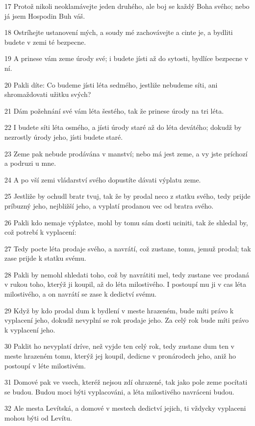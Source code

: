 \par 17 Protož nikoli neoklamávejte jeden druhého, ale boj se každý Boha svého; nebo já jsem Hospodin Buh váš.
\par 18 Ostríhejte ustanovení mých, a soudy mé zachovávejte a cinte je, a bydliti budete v zemi té bezpecne.
\par 19 A prinese vám zeme úrody své; i budete jísti až do sytosti, bydlíce bezpecne v ní.
\par 20 Pakli díte: Co budeme jísti léta sedmého, jestliže nebudeme síti, ani shromaždovati užitku svých?
\par 21 Dám požehnání své vám léta šestého, tak že prinese úrody na tri léta.
\par 22 I budete síti léta osmého, a jísti úrody staré až do léta devátého; dokudž by nezrostly úrody jeho, jísti budete staré.
\par 23 Zeme pak nebude prodávána v manství; nebo má jest zeme, a vy jste príchozí a podruzi u mne.
\par 24 A po vší zemi vládarství svého dopustíte dávati výplatu zeme.
\par 25 Jestliže by ochudl bratr tvuj, tak že by prodal neco z statku svého, tedy prijde príbuzný jeho, nejbližší jeho, a vyplatí prodanou vec od bratra svého.
\par 26 Pakli kdo nemaje výplatce, mohl by tomu sám dosti uciniti, tak že shledal by, což potrebí k vyplacení:
\par 27 Tedy pocte léta prodaje svého, a navrátí, což zustane, tomu, jemuž prodal; tak zase prijde k statku svému.
\par 28 Pakli by nemohl shledati toho, což by navrátiti mel, tedy zustane vec prodaná v rukou toho, kterýž ji koupil, až do léta milostivého. I postoupí mu ji v cas léta milostivého, a on navrátí se zase k dedictví svému.
\par 29 Když by kdo prodal dum k bydlení v meste hrazeném, bude míti právo k vyplacení jeho, dokudž nevyplní se rok prodaje jeho. Za celý rok bude míti právo k vyplacení jeho.
\par 30 Paklit ho nevyplatí dríve, než vyjde ten celý rok, tedy zustane dum ten v meste hrazeném tomu, kterýž jej koupil, dedicne v pronárodech jeho, aniž ho postoupí v léte milostivém.
\par 31 Domové pak ve vsech, kteréž nejsou zdí ohrazené, tak jako pole zeme pocítati se budou. Budou moci býti vyplacováni, a léta milostivého navráceni budou.
\par 32 Ale mesta Levítská, a domové v mestech dedictví jejich, ti vždycky vyplaceni mohou býti od Levítu.
